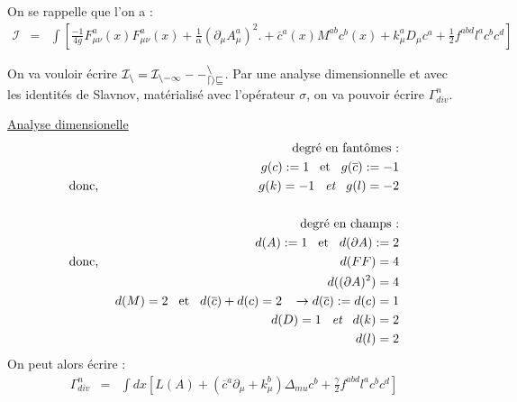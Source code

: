\documentclass[a4paper,11pt]{article}
\theoremstyle{plain}
\theoremstyle{definition}
\theoremstyle{remark}
\numberwithin{equation}{section}
\numberwithin{equation}{subsection}
\numberwithin{figure}{section}
\begin{document}
\noindent
On se rappelle que l'on a :
\begin{eqnarray*}
 \mathcal{I} &=&  \int \left[
\frac{-1}{4g} F^{a}_{\mu\nu}(x)F^{a}_{\mu \nu}(x) 
+ \frac{1}{\alpha}(\partial_{\mu}A_{\mu}^{a})^2 .
+ \overline{c}^{a}(x)M^{ab}c^{b}(x) 
+ k_{\mu}^{a} D_{\mu}c^{a} 
+ \frac{1}{2}f^{abd}l^ac^bc^d \right]
\end{eqnarray*} 

\noindent
On va vouloir écrire $\cal{I}_{n} = \cal{I}_{n-1} - \Gamma_{div}^{n}$. Par une analyse dimensionnelle et avec les identités de Slavnov, 
matérialisé avec l'opérateur $\sigma$, on va pouvoir écrire $\Gamma_{div}^{n}$. 

\noindent
\underline{Analyse dimensionelle}
\begin{eqnarray*}
 && \text{degré en fantômes :}\\
 && g(c) := 1 \hspace{3mm} \text{et} \hspace{3mm} g(\overline{c}):=-1 \\
 \text{donc, } && g(k) = -1 \hspace{3mm} \textit{et} \hspace{3mm} g(l)=-2\\
&& \vspace{3mm} \\
 &&\text{degré en champs :} \\
 && d(A) := 1 \hspace{3mm} \text{et} \hspace{3mm} d(\partial A):=2 \\
\text{donc, }  && d(FF)=4\\
 && d( (\partial A)^{2}) = 4\\
 && d(M) = 2  \hspace{3mm} \text{et} \hspace{3mm} d(\overline{c}) + d(c) =2 \hspace{3mm}  \rightarrow d(\overline{c}) := d(c) = 1 \\
 && d(D) =1  \hspace{3mm} \textit{et} \hspace{3mm} d(k) = 2 \\
 &&  d(l) = 2
\end{eqnarray*}
On peut alors écrire :
\begin{eqnarray}
 \Gamma^{n}_{div} &=& \int dx \left[  L(A) +  \left(  \overline{c}^{a} \partial_{\mu}  + k_{\mu}^{b} \right) \Delta_{mu} c^{b} 
+ \frac{\gamma}{2} f^{abd} l^{a}c^{b}c^{d} \right]
\end{eqnarray}
\end{document}
